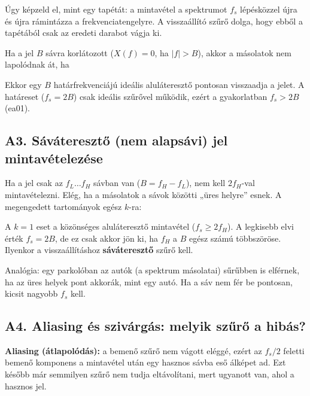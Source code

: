Úgy képzeld el, mint egy tapétát: a mintavétel a spektrumot $f_s$ lépésközzel újra és újra rámintázza a frekvenciatengelyre. A visszaállító szűrő dolga, hogy ebből a tapétából csak az eredeti darabot vágja ki.

Ha a jel $B$ sávra korlátozott ($X(f)=0$, ha $|f|>B$), akkor a másolatok nem lapolódnak át, ha

\begin{center}\end{center}

Ekkor egy $B$ határfrekvenciájú ideális aluláteresztő pontosan visszaadja a jelet. A határeset ($f_s=2B$) csak ideális szűrővel működik, ezért a gyakorlatban $f_s>2B$ (ea01).

\subsection{\texorpdfstring{A3. Sáváteresztő (nem alapsávi) jel mintavételezése}{A3. Sáváteresztő (nem alapsávi) jel mintavételezése}}\label{a2-savatereszto}
Ha a jel csak az $f_L\ldots f_H$ sávban van ($B=f_H-f_L$), nem kell $2f_H$-val mintavételezni. Elég, ha a másolatok a sávok közötti „üres helyre” esnek. A megengedett tartományok egész $k$-ra:

\begin{center}\end{center}

A $k=1$ eset a közönséges aluláteresztő mintavétel ($f_s\ge 2f_H$). A legkisebb elvi érték $f_s=2B$, de ez csak akkor jön ki, ha $f_H$ a $B$ egész számú többszöröse. Ilyenkor a visszaállításhoz \textbf{sáváteresztő} szűrő kell.

Analógia: egy parkolóban az autók (a spektrum másolatai) sűrűbben is elférnek, ha az üres helyek pont akkorák, mint egy autó. Ha a sáv nem fér be pontosan, kicsit nagyobb $f_s$ kell.

\subsection{\texorpdfstring{A4. Aliasing és szivárgás: melyik szűrő a hibás?}{A4. Aliasing és szivárgás: melyik szűrő a hibás?}}\label{a2-szivargas}
\textbf{Aliasing (átlapolódás):} a bemenő szűrő nem vágott eléggé, ezért az $f_s/2$ feletti bemenő komponens a mintavétel után egy hasznos sávba eső álképet ad. Ezt később már semmilyen szűrő nem tudja eltávolítani, mert ugyanott van, ahol a hasznos jel.


